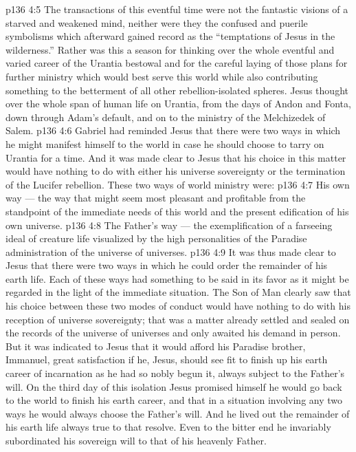 \vs p136 4:5 The transactions of this eventful time were not the fantastic visions of a starved and weakened mind, neither were they the confused and puerile symbolisms which afterward gained record as the “temptations of Jesus in the wilderness.” Rather was this a season for thinking over the whole eventful and varied career of the Urantia bestowal and for the careful laying of those plans for further ministry which would best serve this world while also contributing something to the betterment of all other rebellion\hyp{}isolated spheres. Jesus thought over the whole span of human life on Urantia, from the days of Andon and Fonta, down through Adam’s default, and on to the ministry of the Melchizedek of Salem.
\vs p136 4:6 Gabriel had reminded Jesus that there were two ways in which he might manifest himself to the world in case he should choose to tarry on Urantia for a time. And it was made clear to Jesus that his choice in this matter would have nothing to do with either his universe sovereignty or the termination of the Lucifer rebellion. These two ways of world ministry were:
\vs p136 4:7 \pc {}\bibnobreakspace His own way --- the way that might seem most pleasant and profitable from the standpoint of the immediate needs of this world and the present edification of his own universe.
\vs p136 4:8 \bibnobreakspace The Father’s way --- the exemplification of a farseeing ideal of creature life visualized by the high personalities of the Paradise administration of the universe of universes.
\vs p136 4:9 It was thus made clear to Jesus that there were two ways in which he could order the remainder of his earth life. Each of these ways had something to be said in its favor as it might be regarded in the light of the immediate situation. The Son of Man clearly saw that his choice between these two modes of conduct would have nothing to do with his reception of universe sovereignty; that was a matter already settled and sealed on the records of the universe of universes and only awaited his demand in person. But it was indicated to Jesus that it would afford his Paradise brother, Immanuel, great satisfaction if he, Jesus, should see fit to finish up his earth career of incarnation as he had so nobly begun it, always subject to the Father’s will. On the third day of this isolation Jesus promised himself he would go back to the world to finish his earth career, and that in a situation involving any two ways he would always choose the Father’s will. And he lived out the remainder of his earth life always true to that resolve. Even to the bitter end he invariably subordinated his sovereign will to that of his heavenly Father.
